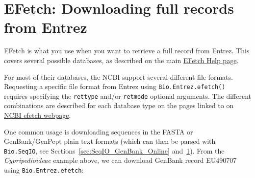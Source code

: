 \section{EFetch: Downloading full records from Entrez}
\label{sec:efetch}

EFetch is what you use when you want to retrieve a full record from Entrez.
This covers several possible databases, as described on the main \href{https://www.ncbi.nlm.nih.gov/books/NBK3837/}{EFetch Help page}.

For most of their databases, the NCBI support several different file formats. Requesting a specific file format from Entrez using \verb|Bio.Entrez.efetch()| requires specifying the \verb|rettype| and/or \verb|retmode| optional arguments.  The different combinations are described for each database type on the pages linked to on \href{https://www.ncbi.nlm.nih.gov/books/NBK25499/#chapter4.EFetch}{NCBI efetch webpage}.

One common usage is downloading sequences in the FASTA or GenBank/GenPept plain text formats (which can then be parsed with \verb|Bio.SeqIO|, see Sections~\ref{sec:SeqIO_GenBank_Online} and~\ref{sec:efetch}). From the \emph{Cypripedioideae} example above, we can download GenBank record EU490707 using \verb+Bio.Entrez.efetch+:

